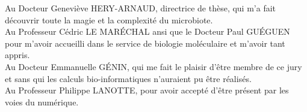 \documentclass[12pt,a4paper]{article}
\begin{document}
Au Docteur Geneviève HERY-ARNAUD, directrice de thèse, qui m'a fait découvrir toute la magie et la complexité du microbiote.\\

Au Professeur Cédric LE MARÉCHAL ansi que le Docteur Paul GUÉGUEN pour m'avoir accueilli dans le service de biologie moléculaire et m'avoir tant appris. \\

Au Docteur Emmanuelle GÉNIN, qui me fait le plaisir d'être membre de ce jury et sans qui les calculs bio-informatiques n'auraient pu être réalisés.\\


Au Professeur Philippe LANOTTE, pour avoir accepté d'être présent par les voies du numérique.

\newpage
\thispagestyle{empty}
\setcounter{page}{0}
\thispagestyle{empty}
\end{document}
